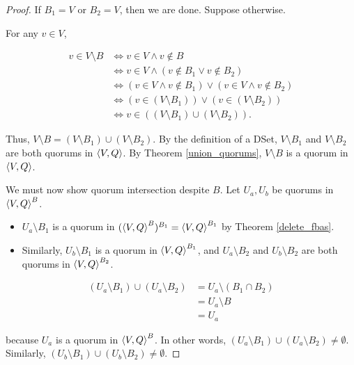 \documentclass[12pt, psamsfonts]{amsart}
\theoremstyle{definition}
\theoremstyle{remark}
\numberwithin{equation}{section}
\begin{document}
\begin{proof}
	If $B_1 = V$ or $B_2 = V$, then we are done.
	Suppose otherwise.

	For any $v \in V$,

	\begin{align*}
	  v \in V \setminus B
		&\iff v \in V \land v \notin B \\
		&\iff v \in V \land (v \notin B_1 \lor v \notin B_2) \\
		&\iff (v \in V \land v \notin B_1) \lor (v \in V \land v \notin B_2) \\
		&\iff (v \in (V \setminus B_1)) \lor (v \in (V \setminus B_2)) \\
		&\iff v \in ((V \setminus B_1) \cup (V \setminus B_2)).
	\end{align*}

	Thus, $V \setminus B = (V \setminus B_1) \cup (V \setminus B_2)$.
	By the definition of a DSet, $V \setminus B_1$ and $V \setminus B_2$ are both quorums in $\ev{V, Q}$.
	By Theorem \ref{union_quorums}, $V \setminus B$ is a quorum in $\ev{V, Q}$.

	We must now show quorum intersection despite $B$.
	Let $U_a, U_b$ be quorums in $\ev{V, Q}^B$.

	\begin{itemize}
		\item
			$U_a \setminus B_1$ is a quorum in $(\ev{V, Q}^B)^{B_1} = \ev{V, Q}^{B_1}$ by Theorem \ref{delete_fbas}.
		\item
			Similarly, $U_b \setminus B_1$ is a quorum in $\ev{V, Q}^{B_1}$, and $U_a \setminus B_2$ and $U_b \setminus B_2$ are both quorums in $\ev{V, Q}^{B_2}$.
	\end{itemize}

	\begin{align*}
	  (U_a \setminus B_1) \cup (U_a \setminus B_2)
		&= U_a \setminus (B_1 \cap B_2) \\
		&= U_a \setminus B \\
		&= U_a
	\end{align*}

	because $U_a$ is a quorum in $\ev{V, Q}^B$.
	In other words, $(U_a \setminus B_1) \cup (U_a \setminus B_2) \ne \emptyset$.
	Similarly, $(U_b \setminus B_1) \cup (U_b \setminus B_2) \ne \emptyset$.


\end{proof}
\end{document}
